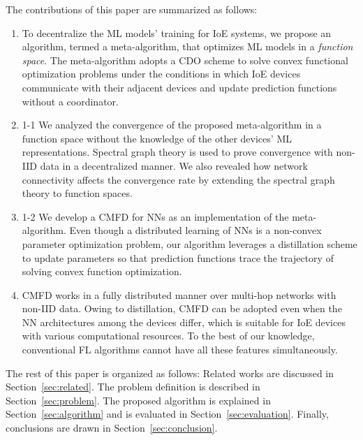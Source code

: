 \documentclass[journal]{IEEEtran}
\begin{document}
The contributions of this paper are summarized as follows:
\begin{enumerate}
\item
To decentralize the \gls{ML} models' training for \gls{IoE} systems,
we propose an algorithm, termed a meta-algorithm, that optimizes \gls{ML} models in a \textit{function space}.
The meta-algorithm adopts a \gls{CDO} scheme to solve convex functional optimization problems
under the conditions in which \gls{IoE} devices communicate with their adjacent devices
and update prediction functions without a coordinator.
\item
\begin{revhl}{1-1}
We analyzed the convergence of the proposed meta-algorithm in a function space without the knowledge of the other devices' \gls{ML} representations.
Spectral graph theory is used to prove convergence with non-\gls{IID} data in a decentralized manner.
We also revealed how network connectivity affects the convergence rate by extending the spectral graph theory to function spaces.
\end{revhl}
\item
\begin{revhl}{1-2}
We develop a \gls{CMFD} for \glspl{NN} as an implementation of the meta-algorithm.
Even though a distributed learning of \glspl{NN} is a non-convex parameter optimization problem,
our algorithm leverages a distillation scheme to update parameters
so that prediction functions trace the trajectory of solving convex function optimization.
\end{revhl}
\item
\Gls{CMFD} works in a fully distributed manner over multi-hop networks with non-\gls{IID} data.
Owing to distillation, \gls{CMFD} can be adopted even when the \gls{NN} architectures among the devices differ,
which is suitable for \gls{IoE} devices with various computational resources.
To the best of our knowledge, conventional \gls{FL} algorithms cannot have all these features simultaneously.
\end{enumerate}

The rest of this paper is organized as follows:
Related works are discussed in Section~\ref{sec:related}.
The problem definition is described in Section~\ref{sec:problem}.
The proposed algorithm is explained in Section~\ref{sec:algorithm}
and is evaluated in Section~\ref{sec:evaluation}.
Finally, conclusions are drawn in Section~\ref{sec:conclusion}.
\end{document}
